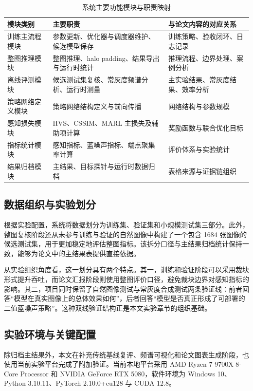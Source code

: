 \documentclass[thesis]{../zstucs-graduation-project}
\begin{document}
\begin{table}[H]
    \centering
    \small
    \caption{系统主要功能模块与职责映射}
    \label{tab:4-1}
    \begin{tabularx}{0.98\textwidth}{>{\raggedright\arraybackslash}p{}YY}
        \toprule
        模块类别 & 主要职责 & 与论文内容的对应关系 \\
        \midrule
        训练主流程模块 & 参数更新、优化器与调度器维护、候选模型保存 & 训练策略、验收闭环、日志记录 \\
        整图推理模块 & 整图推理、halo padding、结果导出与运行时统计 & 推理流程、边界处理、案例分析 \\
        离线评测模块 & 候选测试集复核、常灰度频谱分析、运行时测量 & 主实验结果、常灰度结果、效率分析 \\
        策略网络定义模块 & 策略网络结构定义与前向传播 & 网络结构与参数规模 \\
        感知损失模块 & HVS、CSSIM、MARL 主损失及辅助项计算 & 奖励函数与联合优化目标 \\
        指标统计模块 & 感知指标、蓝噪声指标、端点聚集率计算 & 评价体系与实验统计 \\
        结果归档模块 & 主结果、目标探针与运行时数据归档 & 表格来源与证据链组织 \\
        \bottomrule
    \end{tabularx}
\end{table}

\subsection{数据组织与实验划分}
    根据实验配置，系统将数据划分为训练集、验证集和小规模测试集三部分。此外，整图复核阶段还从未参与训练与验证的自然图像中构建了一个包含 1684 张图像的候选测试集，用于更加稳定地评估整图指标。该拆分口径与主结果归档统计保持一致，能够为论文中的主结果表提供直接依据。

从实验组织角度看，这一划分具有两个特点。其一，训练和验证阶段可以采用裁块形式提升吞吐，而论文汇报阶段则使用整图评价口径，避免裁块边界对感知指标的影响。其二，项目同时保留了自然图像测试与常灰度合成测试两条验证线：前者回答“模型在真实图像上的总体效果如何”，后者回答“模型是否真正形成了可部署的二值蓝噪声策略”。这种双线验证结构正是本文实验章节的组织基础。

\subsection{实验环境与关键配置}
除归档主结果外，本文在补充传统基线复评、频谱可视化和论文图表生成阶段，也使用当前实验平台完成了附加验证。当前本地平台采用 AMD Ryzen 7 9700X 8-Core Processor 和 NVIDIA GeForce RTX 5080，软件环境为 Windows 10、Python 3.10.11、PyTorch 2.10.0+cu128 与 CUDA 12.8。
\end{document}

